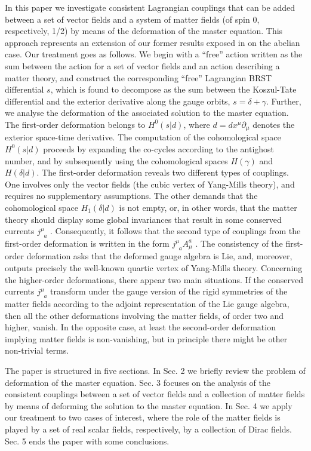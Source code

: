 \documentclass[a4paper,12pt]{article}
\begin{document}
In this paper we investigate consistent
Lagrangian couplings that can be
added between a set of vector fields and a
system of matter fields (of spin
0, respectively, 1/2) by means of the
deformation of the master equation.
This approach represents an extension of
our former results exposed in \cite
{20a} on the abelian case. Our treatment
goes as follows. We begin with a
``free'' action written as the sum between
the action for a set of vector
fields and an action describing a matter theory,
and construct the
corresponding ``free'' Lagrangian BRST
differential $s$, which is found to
decompose as the sum between the Koszul-Tate
differential and the exterior
derivative along the gauge orbits,
$s=\delta +\gamma $. Further, we analyse
the deformation of the associated solution
to the master equation. The
first-order deformation belongs to
$H^{0}\left( s|d\right) $, where $%
d=dx^{\mu }\partial _{\mu }$ denotes
the exterior space-time derivative. The
computation of the cohomological space
$H^{0}\left( s|d\right) $ proceeds by
expanding the co-cycles according to
the antighost number, and by
subsequently using the cohomological spaces
$H\left( \gamma \right) $ and $%
H\left( \delta |d\right) $. The first-order
deformation reveals two
different types of couplings. One involves
only the vector fields (the cubic
vertex of Yang-Mills theory), and requires
no supplementary assumptions. The
other demands that the cohomological space
$H_{1}\left( \delta |d\right) $
is not empty, or, in other words, that the
matter theory should display some
global invariances that result in some
conserved currents $j_{\;\;a}^{\mu }$%
. Consequently, it follows that the second
type of couplings from the
first-order deformation is written in the
form $j_{\;\;a}^{\mu }A_{\mu }^{a}$%
. The consistency of the first-order
deformation asks that the deformed
gauge algebra is Lie, and, moreover,
outputs precisely the well-known
quartic vertex of Yang-Mills theory.
Concerning the higher-order
deformations, there appear two main situations.
If the conserved currents $%
j_{\;\;a}^{\mu }$ transform under the
gauge version of the rigid symmetries
of the matter fields according to the
adjoint representation of the Lie
gauge algebra, then all the other
deformations involving the matter fields,
of order two and higher, vanish. In the
opposite case, at least the
second-order deformation implying matter
fields is non-vanishing, but in
principle there might be other non-trivial terms.

The paper is structured in five sections.
In Sec. 2 we briefly review the
problem of deformation of the master
equation. Sec. 3 focuses on the
analysis of the consistent couplings
between a set of vector fields and a
collection of matter fields by means
of deforming the solution to the master
equation. In Sec. 4 we apply our treatment
to two cases of interest, where
the role of the matter fields is played
by a set of real scalar fields,
respectively, by a collection of Dirac
fields. Sec. 5 ends the paper with
some conclusions.
\end{document}
